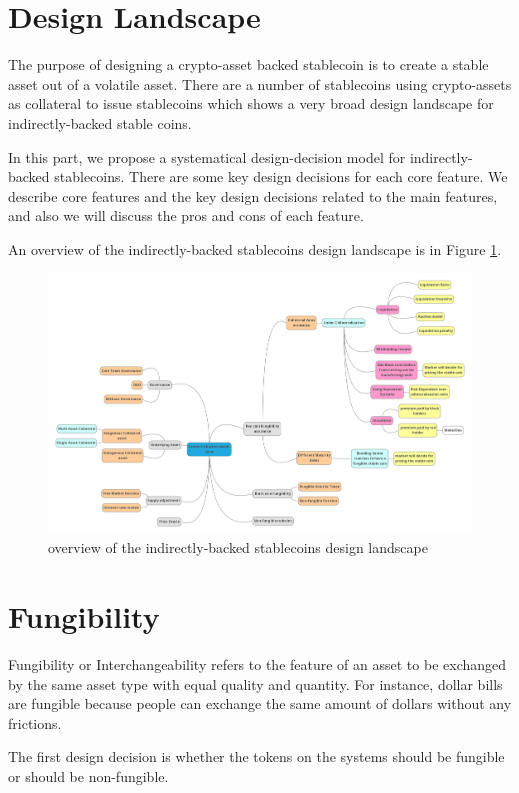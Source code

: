\section{Design Landscape}
The purpose of designing a crypto-asset backed stablecoin is to create a stable asset out of a volatile asset. There are a number of stablecoins using crypto-assets as collateral to issue stablecoins which shows a very broad design landscape for indirectly-backed stable coins.

In this part, we propose a systematical design-decision model for indirectly-backed stablecoins. There are some key design decisions for each core feature. We describe core features and the key design decisions related to the main features, and also we will discuss the pros and cons of each feature.

An overview of the indirectly-backed stablecoins design landscape is in Figure \ref{land}.

\begin{figure} [ht]
\centering
\includegraphics[width=16cm]{Mindmap}
\caption{overview of the indirectly-backed stablecoins design landscape}
\label{land}
\end{figure}

\section{Fungibility}
Fungibility or Interchangeability refers to the feature of an asset to be exchanged by the same asset type with equal quality and quantity. For instance, dollar bills are fungible because people can exchange the same amount of dollars without any frictions.

The first design decision is whether the tokens on the systems should be fungible or should be non-fungible. 

